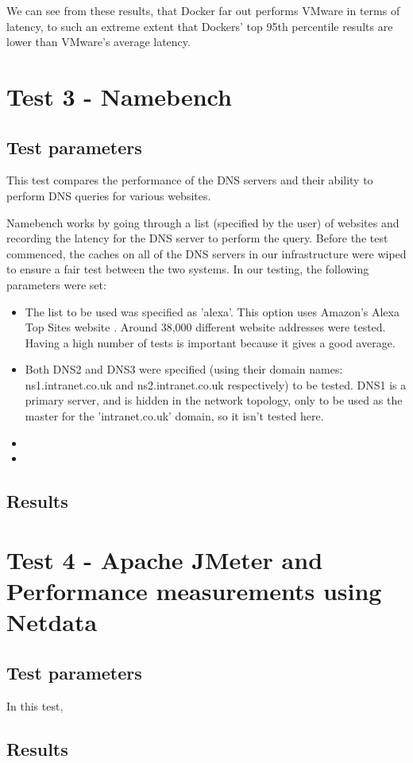 We can see from these results, that Docker far out performs VMware in terms of latency, to such an extreme extent that Dockers' top 95th percentile results are lower than VMware's average latency.

\section{Test 3 - Namebench}
\subsection{Test parameters}
This test compares the performance of the DNS servers and their ability to perform DNS queries for various websites.

Namebench works by going through a list (specified by the user) of websites and recording the latency for the DNS server to perform the query. Before the test commenced, the caches on all of the DNS servers in our infrastructure were wiped to ensure a fair test between the two systems. In our testing, the following parameters were set:
\begin{itemize}
  \item The list to be used was specified as 'alexa'. This option uses Amazon's Alexa Top Sites website \citep{alexainternet}. Around 38,000 different website addresses were tested. Having a high number of tests is important because it gives a good average.
  \item Both DNS2 and DNS3 were specified (using their domain names: ns1.intranet.co.uk and ns2.intranet.co.uk respectively) to be tested. DNS1 is a primary server, and is hidden in the network topology, only to be used as the master for the 'intranet.co.uk' domain, so it isn't tested here.
  \item 
  \item 
\end{itemize}
\subsection{Results}



\section{Test 4 - Apache JMeter and Performance measurements using Netdata}
\subsection{Test parameters}
In this test, 

\subsection{Results}

